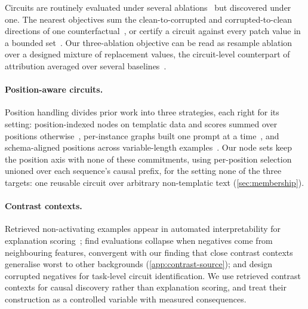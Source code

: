 \documentclass[10pt]{article}
\begin{document}
Circuits are routinely evaluated under several ablations~\citep{miller2024transformer, mueller2025mib} but discovered under one.
The nearest objectives sum the clean-to-corrupted and corrupted-to-clean directions of one counterfactual~\citep{chen2025rethinking}, or certify a circuit against every patch value in a bounded set~\citep{hadad2026formal}.
Our three-ablation objective can be read as resample ablation over a designed mixture of replacement values, the circuit-level counterpart of attribution averaged over several baselines~\citep{kapishnikov2019xrai, erion2021improving}.

\paragraph{Position-aware circuits.}
Position handling divides prior work into three strategies, each right for its setting: position-indexed nodes on templatic data and scores summed over positions otherwise~\citep{marks2025sparse}, per-instance graphs built one prompt at a time~\citep{ameisen2025circuit}, and schema-aligned positions across variable-length examples~\citep{haklay2025position}.
Our node sets keep the position axis with none of these commitments, using per-position selection unioned over each sequence's causal prefix, for the setting none of the three targets: one reusable circuit over arbitrary non-templatic text (\cref{sec:membership}).

\paragraph{Contrast contexts.}
Retrieved non-activating examples appear in automated interpretability for explanation scoring~\citep{paulo2024automatically}; \citet{paulo2025evaluating} find evaluations collapse when negatives come from neighbouring features, convergent with our finding that close contrast contexts generalise worst to other backgrounds (\cref{app:contrast-source}); and \citet{oneill2024sparse} design corrupted negatives for task-level circuit identification.
We use retrieved contrast contexts for causal discovery rather than explanation scoring, and treat their construction as a controlled variable with measured consequences.
\end{document}
